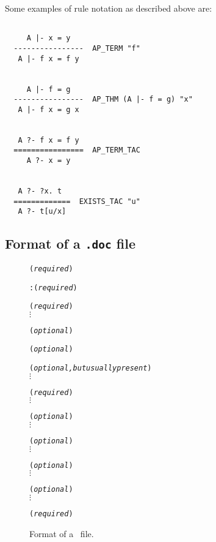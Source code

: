 Some examples of rule notation as described above are:

\begin{verbatim}

     A |- x = y
  ----------------  AP_TERM "f"
   A |- f x = f y


     A |- f = g
  ----------------  AP_THM (A |- f = g) "x"
   A |- f x = g x


   A ?- f x = f y
  ================  AP_TERM_TAC
     A ?- x = y


   A ?- ?x. t
  =============  EXISTS_TAC "u"
   A ?- t[u/x]

\end{verbatim}

\newpage

\subsection{Format of a {\tt .doc} file}

\begin{figure}[h]
\begin{boxed}\begin{alltt}
\vsp{}                            ({\it required} )

\vsp\lb{}\vsp:\vsp{}\rb                 ({\it required} )

                              ({\it required} )
\(\vdots\)

                              ({\it optional})

                               ({\it optional})

                              ({\it optional, but usually present} )
\(\vdots \)

                               ({\it required} )
\(\vdots \)

                               ({\it optional} )
\(\vdots \)

                                  ({\it optional} )
\(\vdots \)

                              ({\it optional} )
\(\vdots \)

                               ({\it optional} )
\(\vdots \)

                                ({\it required} )
\end{alltt}\end{boxed}
\caption{Format of a \doc\ file.\label{doc-fig}}
\end{figure}

